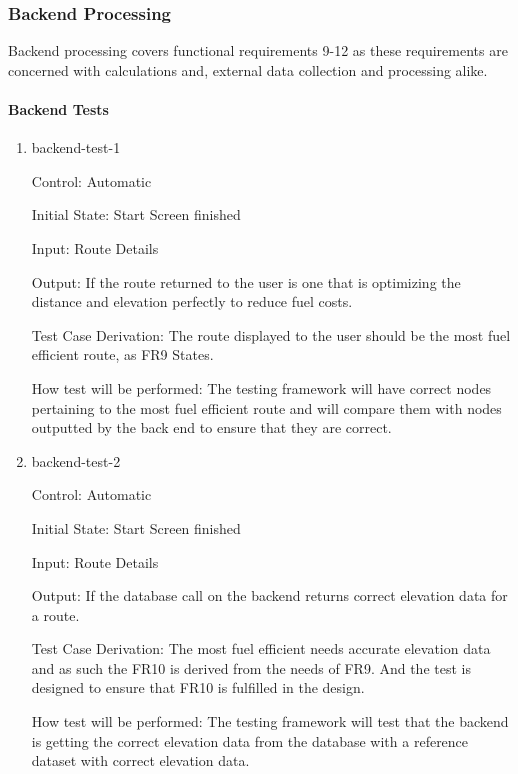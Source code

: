 \documentclass[12pt, titlepage]{article}
\begin{document}
\subsubsection{Backend Processing}

Backend processing covers functional requirements 9-12 as these 
requirements are concerned with calculations and, external data collection and processing 
alike.
		
\paragraph{Backend Tests}

\begin{enumerate}

\item{backend-test-1\\}

Control: Automatic
					
Initial State: Start Screen finished
					
Input: Route Details
					
Output: If the route returned to the user is one that is optimizing the distance and elevation perfectly to reduce fuel costs.

Test Case Derivation: The route displayed to the user should be the most fuel efficient route, as FR9 States.
					
How test will be performed: The testing framework will have correct nodes pertaining to the most fuel efficient route and will 
compare them with nodes outputted by the back end to ensure that they are correct.
					
\item{backend-test-2\\}

Control: Automatic
					
Initial State: Start Screen finished
					
Input: Route Details
					
Output: If the database call on the backend returns correct elevation data for a route.

Test Case Derivation: The most fuel efficient needs accurate elevation data and as such the FR10 is derived from the needs of FR9. And 
the test is designed to ensure that FR10 is fulfilled in the design.
					
How test will be performed: The testing framework will test that the backend is getting the correct elevation data from the database 
with a reference dataset with correct elevation data.
					

\end{enumerate}
\end{document}
